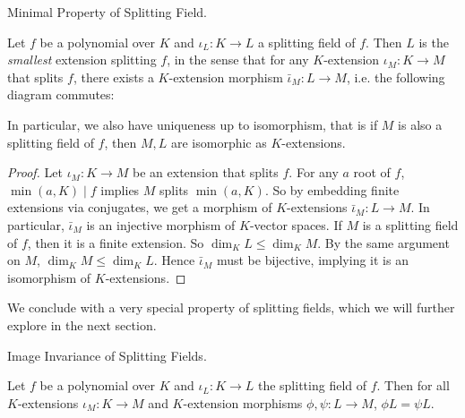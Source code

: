 \documentclass[../book.tex]{subfiles}
\begin{document}
\begin{thm} Minimal Property of Splitting Field. 
    
    Let $f$ be a polynomial over $K$ and 
    $\iota_L : K \to L$ a splitting field of $f$.
    Then $L$ is the \emph{smallest} extension splitting $f$, in the sense that 
    for any $K$-extension $\iota_M : K \to M$ that splits $f$, 
    there exists a $K$-extension morphism $\bar\iota_M : L \to M$,
    i.e. the following diagram commutes: 
    \begin{figure}[H]
        \centering
    \end{figure}
    In particular, we also have uniqueness up to isomorphism, that is
    if $M$ is also a splitting field of $f$, 
    then $M,L$ are isomorphic as $K$-extensions.
    
\end{thm}
\begin{proof}
    Let $\iota_M : K \to M$ be an extension that splits $f$. 
    For any $a$ root of $f$, $\min(a,K) \mid f$ implies $M$ splits $\min(a,K)$.
    So by embedding finite extensions via conjugates,
    we get a morphism of $K$-extensions $\bar\iota_M : L \to M$. 
    In particular, $\bar\iota_M$ is an injective morphism of $K$-vector spaces.
    If $M$ is a splitting field of $f$, then it is a finite extension.
    So $\dim_K L \leq \dim_K M$. 
    By the same argument on $M$, $\dim_K M \leq \dim_K L$.
    Hence $\bar\iota_M$ must be bijective,
    implying it is an isomorphism of $K$-extensions. 
\end{proof}
\begin{rmk}
    We conclude with a very special property of splitting fields,
    which we will further explore in the next section. 
\end{rmk}
\begin{thm} Image Invariance of Splitting Fields. 
    
    Let $f$ be a polynomial over $K$ and 
    $\iota_L : K \to L$ the splitting field of $f$.
    Then for all $K$-extensions $\iota_M : K \to M$ and
    $K$-extension morphisms $\phi, \psi : L \to M$, $\phi L = \psi L$. 
\end{thm}
\end{document}
